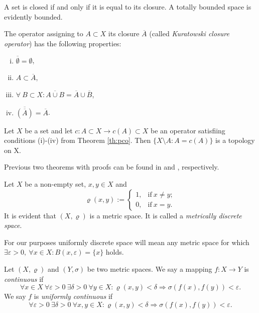 A set is closed if and only if it is equal to its closure. A totally bounded space is evidently bounded.

\begin{theorem} \label{th:pco}
	The operator assigning to $A\subset X$ its closure $\overline{A}$ (called \emph{Kuratowski closure operator}) has the following properties:
\begin{enumerate}[(i)]
	\item $\overline{\emptyset}=\emptyset$,
	\item $A\subset \overline{A}$,
	\item $\forall\ B\subset X: \overline{A\cup B} = \overline{A}\cup \overline{B}$,
	\item $\overline{(\overline{A})}=\overline{A}$.
\end{enumerate}
\end{theorem}

\begin{theorem} \label{th:ico}
Let $X$ be a set and let $c: A\subset X\to c(A)\subset X$ be an operator satisfiing conditions (i)-(iv) from Theorem \ref{th:pco}. Then $\{X\setminus A: A=c(A)\}$ is a topology on X.
\end{theorem}

Previous two theorems with proofs can be found in \cite[Theorem~1.1.3]{engelking89} and \cite[Proposition~1.2.7]{engelking89}, respectively.

\begin{example}\label{ex:msp}
	Let $X$ be a non-empty set, $x,y\in X$ and
\[
	\varrho(x,y):= \left\{ \begin{array}{ll}1, & \mathrm{if}\ x\ne y; \\ 0, & \mathrm{if}\ x=y. \end{array} \right.
\]
	It is evident that $(X,\varrho)$ is a metric space. It is called a \emph{metrically discrete space}.
\end{example}

For our purposes uniformly discrete space will mean any metric space for which $\exists \varepsilon>0,\ \forall x\in X : B(x,\varepsilon)=\{x\}$ holds.

\begin{define}\label{def:contf}
	Let $(X,\varrho)$ and $(Y,\sigma)$ be two metric spaces. We say a mapping $f:X\to Y$ is \emph{continuous} if
\[
	\forall x\in X\ \forall \varepsilon>0\ \exists \delta>0\ \forall y\in X: \varrho(x,y)<\delta \Rightarrow \sigma(f(x), f(y))<\varepsilon.
\]
We say $f$ is \emph{uniformly continuous} if
\[
	\forall \varepsilon>0\ \exists \delta>0\ \forall x,y\in X: \varrho(x,y)<\delta \Rightarrow \sigma(f(x), f(y))<\varepsilon.
\]
\end{define}

